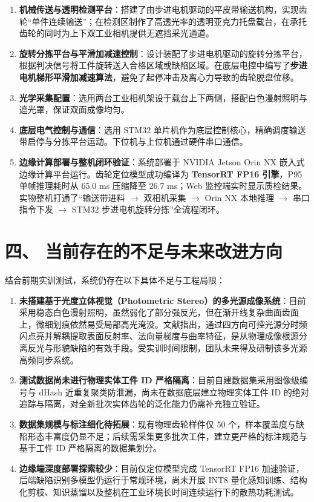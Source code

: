 \begin{enumerate}
    \item \textbf{机械传送与透明检测平台}：搭建了由步进电机驱动的平皮带输送机构，实现齿轮“单件连续输送”；在检测区制作了高透光率的透明亚克力托盘载台，在承托齿轮的同时为上下双工业相机提供无遮挡采光通道。
    \item \textbf{旋转分拣平台与平滑加减速控制}：设计装配了步进电机驱动的旋转分拣平台，根据判决信号将工件旋转送入合格区域或缺陷区域。在底层电控中编写了\textbf{步进电机梯形平滑加减速算法}，避免了起停冲击及离心力导致的齿轮脱盘位移。
    \item \textbf{光学采集配置}：选用两台工业相机架设于载台上下两侧，搭配白色漫射照明与遮光罩，保证双面成像均匀。
    \item \textbf{底层电气控制与通信}：选用 STM32 单片机作为底层控制核心，精确调度输送带启停与分拣平台运动。下位机与上位机通过硬件串口通信。
    \item \textbf{边缘计算部署与整机闭环验证}：系统部署于 NVIDIA Jetson Orin NX 嵌入式边缘计算平台运行。齿轮定位模型成功编译为 \textbf{TensorRT FP16 引擎}，P95 单帧推理耗时从 65.0 ms 压缩降至 26.7 ms；Web 监控端实时显示质检结果。实物整机打通了“输送带进料 $\rightarrow$ 双相机采集 $\rightarrow$ Orin NX 本地推理 $\rightarrow$ 串口指令下发 $\rightarrow$ STM32 步进电机旋转分拣”全流程闭环。
\end{enumerate}

\section*{四、 当前存在的不足与未来改进方向}

结合前期实训测试，系统仍存在以下具体不足与工程局限：

\begin{enumerate}
    \item \textbf{未搭建基于光度立体视觉（Photometric Stereo）的多光源成像系统}：目前采用稳态白色漫射照明，虽然弱化了部分强反光，但在渐开线复杂曲面齿面上，微细划痕依然易受局部高光淹没。文献指出，通过四方向可控光源分时频闪点亮并解耦提取表面反射率、法向量梯度与曲率特征，是从物理成像根源分离反光与形貌缺陷的有效手段。受实训时间限制，团队未来得及研制该多光源高频同步系统。
    \item \textbf{测试数据尚未进行物理实体工件 ID 严格隔离}：目前自建数据集采用图像级编号与 dHash 近重复聚类防泄漏，尚未在数据底层建立物理实体工件 ID 的绝对追踪与隔离，对全新批次实体齿轮的泛化能力仍需补充独立验证。
    \item \textbf{数据集规模与标注细化待拓展}：现有物理齿轮样件仅 50 个，样本覆盖度与缺陷形态丰富度仍显不足；后续需采集更多批次工件，建立更严格的标注规范与基于工件 ID 严格隔离的数据集划分。
    \item \textbf{边缘端深度部署探索较少}：目前仅定位模型完成 TensorRT FP16 加速验证，后端缺陷识别多模型仍运行于常规环境，尚未开展 INT8 量化感知训练、结构化剪枝、知识蒸馏以及整机在工业环境长时间连续运行下的散热功耗测试。
\end{enumerate}

